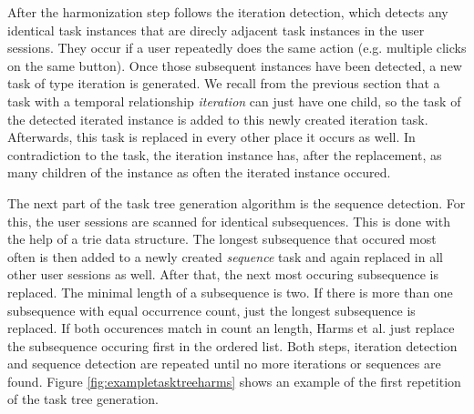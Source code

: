 After the harmonization step follows the iteration detection, which detects any identical task instances that are direcly adjacent task instances in the user sessions. They occur if a user repeatedly does the same action (e.g. multiple clicks on the same button).
Once those subsequent instances have been detected, a new task of type iteration is generated.
We recall from the previous section that a task with a temporal relationship \textit{iteration} can just have one child, so the task of the detected iterated instance is added to this newly created iteration task.
Afterwards, this task is replaced in every other place it occurs as well.
In contradiction to the task, the iteration instance has, after the replacement, as many children of the instance as often the iterated instance occured.

The next part of the task tree generation algorithm is the sequence detection.
For this, the user sessions are scanned for identical subsequences. This is done with the help of a trie data structure.
The longest subsequence that occured most often is then added to a newly created \textit{sequence} task and again replaced in
all other user sessions as well. After that, the next most occuring subsequence is replaced. The minimal length of a subsequence is two.
If there is more than one subsequence with equal occurrence count, just the longest subsequence is replaced.
If both occurences match in count an length, Harms et al. just replace the subsequence occuring first in the ordered list.
Both steps, iteration detection and sequence detection are repeated until no more iterations or sequences are found.
Figure \ref{fig:exampletasktreeharms} shows an example of the first repetition of the task tree generation.

